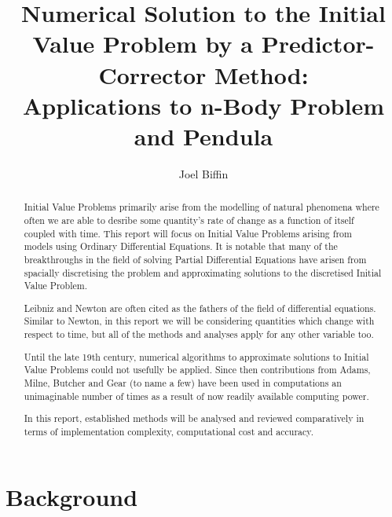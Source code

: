 \documentclass[12pt, twoside]{report}
\theoremstyle{plain}
\theoremstyle{definition}
\begin{document}

\title{
    \large{Numerical Solution to the Initial Value Problem by a 
    Predictor-Corrector Method:}\\
    Applications to n-Body Problem and Pendula}
\author{Joel Biffin}
\maketitle


\tableofcontents


\begin{abstract}

    Initial Value Problems primarily arise from the modelling of natural
    phenomena where often we are able to desribe some quantity's rate of change
    as a function of itself coupled with time. This report will focus on
    Initial Value Problems arising from models using Ordinary Differential
    Equations. It is notable that many of the breakthroughs in the field of
    solving Partial Differential Equations have arisen from spacially
    discretising the problem and approximating solutions to the discretised
    Initial Value Problem.

    Leibniz and Newton are often cited as the fathers of the field of
    differential equations. Similar to Newton, in this report we will be
    considering quantities which change with respect to time, but all of the
    methods and analyses apply for any other variable too. 

    Until the late 19th century, numerical algorithms to approximate solutions
    to Initial Value Problems could not usefully be applied. Since then
    contributions from Adams, Milne, Butcher and Gear (to name a few) have been
    used in computations an unimaginable number of times as a result of now 
    readily available computing power. 

    In this report, established methods will be analysed and reviewed 
    comparatively in terms of implementation complexity, computational cost
    and accuracy.

\end{abstract}



\chapter{Background}
    
\end{document}
